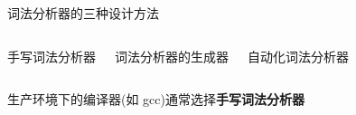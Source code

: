 \begin{frame}{}
  \begin{center}
    {\large 词法分析器的三种设计方法}
  \end{center}

  \begin{columns}
      \begin{center}
        手写词法分析器
      \end{center}
      \begin{center}
        词法分析器的生成器
      \end{center}
      \begin{center}
        自动化词法分析器
      \end{center}
  \end{columns}

  \vspace{0.30cm}
  \begin{center}
    生产环境下的编译器(如 gcc)通常选择{\bf 手写词法分析器}
  \end{center}
\end{frame}
